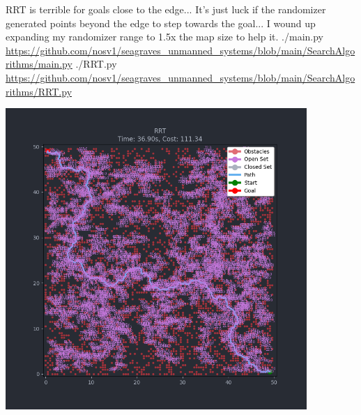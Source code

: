 \documentclass{article}
\begin{document}
\begin{minipage}{\linewidth}
                RRT is terrible for goals close to the edge... It's just luck if the randomizer generated points beyond the edge to step towards the goal... I wound up expanding my randomizer range to 1.5x the map size to help it.
                \break
                ./main.py \break
                \url{https://github.com/nosv1/seagraves_unmanned_systems/blob/main/SearchAlgorithms/main.py} \break
                ./RRT.py \break
                \url{https://github.com/nosv1/seagraves_unmanned_systems/blob/main/SearchAlgorithms/RRT.py}
                \begin{center}
                    \includegraphics[height=4.5in]{HW3P3 RRT.png}
                \end{center}
            \end{minipage}
\end{document}
